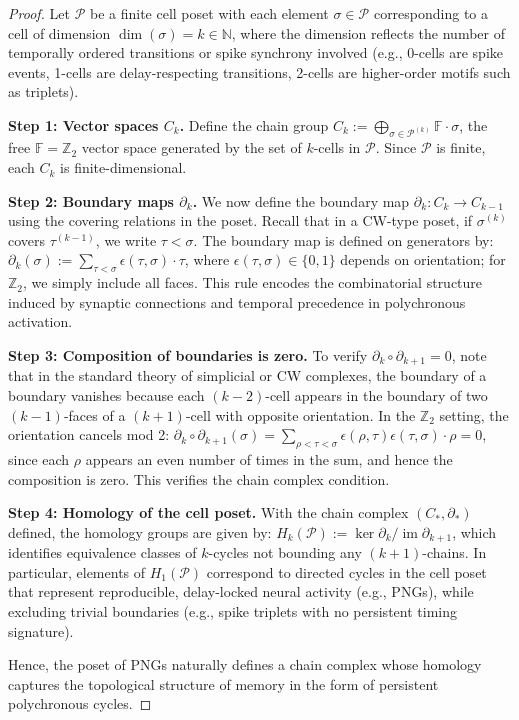 \documentclass[lettersize,journal]{IEEEtran}
\begin{document}
\begin{proof}
Let \( \mathcal{P} \) be a finite cell poset with each element \( \sigma \in \mathcal{P} \) corresponding to a cell of dimension \( \dim(\sigma) = k \in \mathbb{N} \), where the dimension reflects the number of temporally ordered transitions or spike synchrony involved (e.g., 0-cells are spike events, 1-cells are delay-respecting transitions, 2-cells are higher-order motifs such as triplets).

\textbf{Step 1: Vector spaces \( C_k \).}  
Define the chain group \( C_k := \bigoplus_{\sigma \in \mathcal{P}^{(k)}} \mathbb{F} \cdot \sigma \), the free \(\mathbb{F}=\mathbb{Z}_2\) vector space generated by the set of \(k\)-cells in \( \mathcal{P} \). Since \( \mathcal{P} \) is finite, each \( C_k \) is finite-dimensional.

\textbf{Step 2: Boundary maps \( \partial_k \).}  
We now define the boundary map \( \partial_k: C_k \to C_{k-1} \) using the covering relations in the poset. Recall that in a CW-type poset, if \( \sigma^{(k)} \) covers \( \tau^{(k-1)} \), we write \( \tau < \sigma \). The boundary map is defined on generators by:
$\partial_k(\sigma) := \sum_{\tau < \sigma} \epsilon(\tau, \sigma) \cdot \tau$,
where \( \epsilon(\tau, \sigma) \in \{0,1\} \) depends on orientation; for \( \mathbb{Z}_2 \), we simply include all faces. This rule encodes the combinatorial structure induced by synaptic connections and temporal precedence in polychronous activation.

\textbf{Step 3: Composition of boundaries is zero.}  
To verify \( \partial_k \circ \partial_{k+1} = 0 \), note that in the standard theory of simplicial or CW complexes, the boundary of a boundary vanishes because each \((k-2)\)-cell appears in the boundary of two \((k-1)\)-faces of a \((k+1)\)-cell with opposite orientation. In the \(\mathbb{Z}_2\) setting, the orientation cancels mod 2:
$\partial_k \circ \partial_{k+1}(\sigma) = \sum_{\rho < \tau < \sigma} \epsilon(\rho, \tau)\epsilon(\tau, \sigma) \cdot \rho = 0$,
since each \( \rho \) appears an even number of times in the sum, and hence the composition is zero. This verifies the chain complex condition.

\textbf{Step 4: Homology of the cell poset.}  
With the chain complex \( (C_*, \partial_*) \) defined, the homology groups are given by:
$H_k(\mathcal{P}) := \ker \partial_k / \operatorname{im} \partial_{k+1}$,
which identifies equivalence classes of \(k\)-cycles not bounding any \((k+1)\)-chains. In particular, elements of \( H_1(\mathcal{P}) \) correspond to directed cycles in the cell poset that represent reproducible, delay-locked neural activity (e.g., PNGs), while excluding trivial boundaries (e.g., spike triplets with no persistent timing signature).

Hence, the poset of PNGs naturally defines a chain complex whose homology captures the topological structure of memory in the form of persistent polychronous cycles.
\end{proof}
\end{document}
